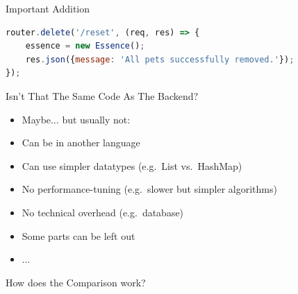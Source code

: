 \begin{frame}[fragile]{Important Addition}

\begin{lstlisting}[language=Javascript]
router.delete('/reset', (req, res) => {
    essence = new Essence();
    res.json({message: 'All pets successfully removed.'});
});
\end{lstlisting}

\end{frame}


\begin{frame}[fragile]{Isn't That The Same Code As The Backend?}

\begin{itemize}
\item Maybe$\ldots$ but usually not:
\item Can be in another language
\item Can use simpler datatypes (e.g.~List vs.~HashMap)
\item No performance-tuning (e.g.~slower but simpler algorithms)
\item No technical overhead (e.g.~database)
\item Some parts can be left out
\item $\ldots$
\end{itemize}

\end{frame}

\begin{frame}[fragile]{}

\begin{center}
{\Huge
How does the Comparison work?
}
\end{center}

\end{frame}

